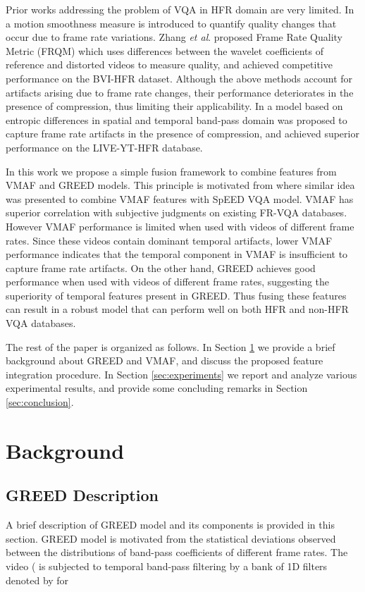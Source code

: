 \documentclass[conference]{IEEEtran}
\newcommand{\etal}{\textit{et al}. }
\begin{document}
Prior works addressing the problem of VQA in HFR domain are very limited. In \cite{nasiri2018temporal} a motion smoothness measure is introduced to quantify quality changes that occur due to frame rate variations. Zhang \etal \cite{zhang2017frame} proposed Frame Rate Quality Metric (FRQM) which uses differences between the wavelet coefficients of reference and distorted videos to measure quality, and achieved competitive performance on the BVI-HFR dataset. Although the above methods account for artifacts arising due to frame rate changes, their performance deteriorates in the presence of compression, thus limiting their applicability. In \cite{madhusudana2020stgreed} a model based on entropic differences in spatial and temporal band-pass domain was proposed to capture frame rate artifacts in the presence of compression, and achieved superior performance on the LIVE-YT-HFR database.

In this work we propose a simple fusion framework to combine features from VMAF \cite{VMAF2016} and GREED \cite{madhusudana2020stgreed} models. This principle is motivated from \cite{bampis2018spatiotemporal} where similar idea was presented to combine VMAF features with SpEED \cite{bampis2017speed} VQA model. VMAF has superior correlation with subjective judgments on existing FR-VQA databases. However VMAF performance is limited when used with videos of different frame rates. Since these videos contain dominant temporal artifacts, lower VMAF performance indicates that the temporal component in VMAF is insufficient to capture frame rate artifacts. On the other hand, GREED achieves good performance when used with videos of different frame rates, suggesting the superiority of temporal features present in GREED. Thus fusing these features can result in a robust model that can perform well on both HFR and non-HFR VQA databases. 

The rest of the paper is organized as follows. In Section \ref{sec:GREED} we provide a brief background about GREED and VMAF, and discuss the proposed feature integration procedure. In Section \ref{sec:experiments} we report and analyze various experimental results, and provide some concluding remarks in Section \ref{sec:conclusion}.

\section{Background}
\label{sec:GREED}

\subsection{GREED Description}
A brief description of GREED \cite{madhusudana2020stgreed} model and its components is provided in this section. GREED model is motivated from the statistical deviations observed between the distributions of band-pass coefficients of different frame rates. The video  ( is subjected to temporal band-pass filtering by a bank of  1D filters denoted by  for 
\end{document}
